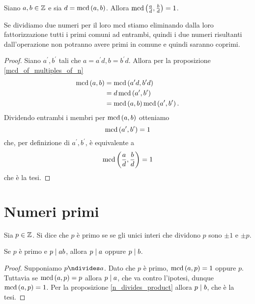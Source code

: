 \begin{corollary} \label{mcd_diviso_mcd}
    Siano $a, b \in \mathbb{Z}$ e sia $d = \operatorname{mcd}\left(a, b\right)$. Allora $\operatorname{mcd}\left(\frac{a}{d}, \frac{b}{d}\right) = 1$.
\end{corollary}
\begin{intuition}
    Se dividiamo due numeri per il loro mcd stiamo eliminando dalla loro fattorizzazione tutti i primi comuni ad entrambi, quindi i due numeri risultanti dall'operazione non potranno avere primi in comune e quindi saranno coprimi.
\end{intuition}
\begin{proof}
    Siano $a^\prime, b^\prime$ tali che $a = a^\prime d, b = b^\prime d$. Allora per la proposizione \ref{mcd_of_multiples_of_n}
    \begin{alignat*}{1}
        \operatorname{mcd}\left(a, b\right) &= \operatorname{mcd}\left(a^\prime d, b^\prime d\right) \\
                   &= d\operatorname{mcd}\left(a^\prime, b^\prime\right) \\
                   &= \operatorname{mcd}\left(a, b\right) \operatorname{mcd}\left(a^\prime, b^\prime\right).
        \end{alignat*} 
    Dividendo entrambi i membri per $\operatorname{mcd}\left(a, b\right)$ otteniamo \[
        \operatorname{mcd}\left(a^\prime, b^\prime\right) = 1 
    \]
    che, per definizione di $a^\prime, b^\prime$, è equivalente a \[
        \operatorname{mcd}\left(\frac{a}{d}, \frac{b}{d}\right) = 1
    \]
    che è la tesi.
\end{proof}

\section{Numeri primi}

\begin{definition}
    Sia $p \in \mathbb{Z}$. Si dice che $p$ è primo se se gli unici interi che dividono $p$ sono
    $\pm 1$ e $\pm p$.
\end{definition}

\begin{proposition}\label{primo_divide_prodotto}
    Se $p$ è primo e $p \mid ab$, allora $p \mid a$ oppure $p \mid b$.
\end{proposition}
\begin{proof}
    Supponiamo $p \ndivides a$. Dato che $p$ è primo, $\operatorname{mcd}\left(a, p\right) = 1$ oppure $p$.
    Tuttavia se $\operatorname{mcd}\left(a, p\right) = p$ allora $p \mid a$, che va contro l'ipotesi, dunque 
    $\operatorname{mcd}\left(a, p\right) = 1$. Per la proposizione \ref{n_divides_product} allora $p \mid b$, che è la tesi.
\end{proof}

